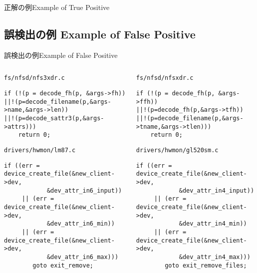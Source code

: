 \begin{frame}[fragile]{正解の例}{Example of True Positive}
\begin{overlayarea}{24em}{3em}
{
}
\end{overlayarea}
\end{frame}
\subsection{誤検出の例 Example of False Positive}
\begin{frame}[fragile]{誤検出の例}{Example of False Positive}
\begin{columns}
\begin{column}{12em}
\texttt{\tiny fs/nfsd/nfs3xdr.c}
\begin{lstlisting}[firstnumber=423]
if (!(p = decode_fh(p, &args->fh))
||!(p=decode_filename(p,&args->name,&args->len))
||!(p=decode_sattr3(p,&args->attrs)))
    return 0;
\end{lstlisting}
\texttt{\tiny drivers/hwmon/lm87.c}
\begin{lstlisting}[firstnumber=688]
if ((err = device_create_file(&new_client->dev, 
            &dev_attr_in6_input)) 
     || (err = device_create_file(&new_client->dev, 
            &dev_attr_in6_min)) 
     || (err = device_create_file(&new_client->dev, 
            &dev_attr_in6_max))) 
        goto exit_remove; 
\end{lstlisting}
\end{column}
\begin{column}{13em}
\texttt{\tiny fs/nfsd/nfsxdr.c}
\begin{lstlisting}[firstnumber=344]
if (!(p = decode_fh(p, &args->ffh))
||!(p=decode_fh(p,&args->tfh))
||!(p=decode_filename(p,&args->tname,&args->tlen)))
    return 0;
\end{lstlisting}
\texttt{\tiny drivers/hwmon/gl520sm.c}
\begin{lstlisting}[firstnumber=615]
if ((err = device_create_file(&new_client->dev,
            &dev_attr_in4_input))
     || (err = device_create_file(&new_client->dev,
            &dev_attr_in4_min))
     || (err = device_create_file(&new_client->dev,
            &dev_attr_in4_max)))
        goto exit_remove_files;
\end{lstlisting}
\end{column}
\end{columns}
\end{frame}


